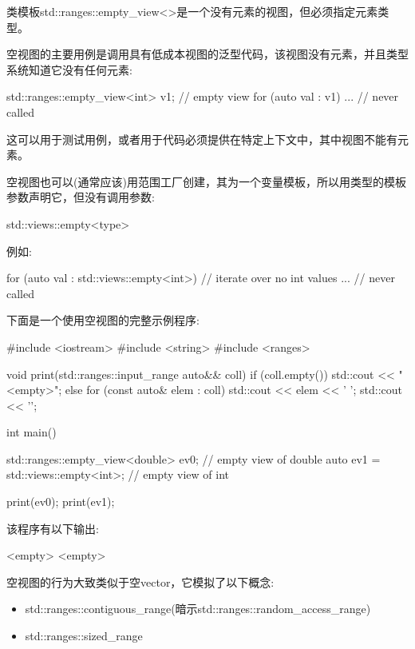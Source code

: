 类模板std::ranges::empty\_view<>是一个没有元素的视图，但必须指定元素类型。

空视图的主要用例是调用具有低成本视图的泛型代码，该视图没有元素，并且类型系统知道它没有任何元素:

\begin{cpp}
std::ranges::empty_view<int> v1; // empty view
for (auto val : v1) {
	... // never called
}
\end{cpp}

这可以用于测试用例，或者用于代码必须提供在特定上下文中，其中视图不能有元素。


空视图也可以(通常应该)用范围工厂创建，其为一个变量模板，所以用类型的模板参数声明它，但没有调用参数:

\begin{cpp}
std::views::empty<type>
\end{cpp}

例如:

\begin{cpp}
for (auto val : std::views::empty<int>) { // iterate over no int values
	... // never called
}
\end{cpp}

下面是一个使用空视图的完整示例程序:


\begin{cpp}
#include <iostream>
#include <string>
#include <ranges>

void print(std::ranges::input_range auto&& coll)
{
	if (coll.empty()) {
		std::cout << "<empty>\n";
	}
	else {
		for (const auto& elem : coll) {
			std::cout << elem << ' ';
		}
		std::cout << '\n';
	}
}

int main()
{
	std::ranges::empty_view<double> ev0; // empty view of double
	auto ev1 = std::views::empty<int>; // empty view of int
	
	print(ev0);
	print(ev1);
}
\end{cpp}

该程序有以下输出:

\begin{shell}
<empty>
<empty>
\end{shell}


空视图的行为大致类似于空vector，它模拟了以下概念:

\begin{itemize}
\item
std::ranges::contiguous\_range(暗示std::ranges::random\_access\_range)

\item
std::ranges::sized\_range
\end{itemize}

